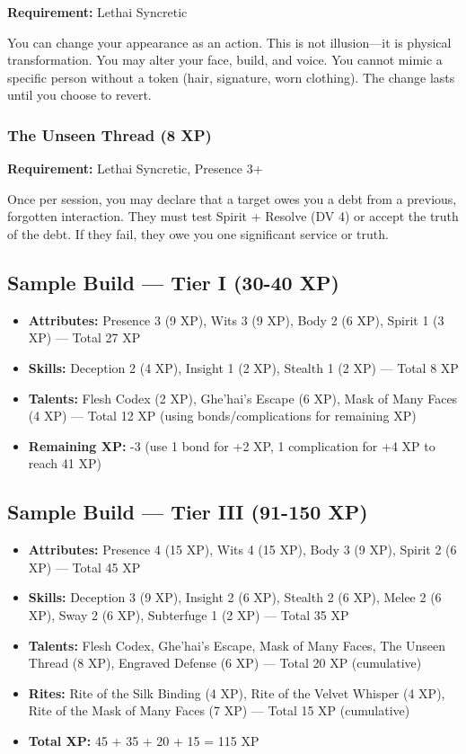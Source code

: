 \textbf{Requirement:} Lethai Syncretic

You can change your appearance as an action. This is not illusion—it is physical transformation. You may alter your face, build, and voice. You cannot mimic a specific person without a token (hair, signature, worn clothing). The change lasts until you choose to revert.

\subsubsection{The Unseen Thread (8 XP)}

\textbf{Requirement:} Lethai Syncretic, Presence 3+

Once per session, you may declare that a target owes you a debt from a previous, forgotten interaction. They must test Spirit + Resolve (DV 4) or accept the truth of the debt. If they fail, they owe you one significant service or truth.

\subsection{Sample Build — Tier I (30-40 XP)}

\begin{itemize}
\item \textbf{Attributes:} Presence 3 (9 XP), Wits 3 (9 XP), Body 2 (6 XP), Spirit 1 (3 XP) — Total 27 XP
\item \textbf{Skills:} Deception 2 (4 XP), Insight 1 (2 XP), Stealth 1 (2 XP) — Total 8 XP
\item \textbf{Talents:} Flesh Codex (2 XP), Ghe'hai's Escape (6 XP), Mask of Many Faces (4 XP) — Total 12 XP (using bonds/complications for remaining XP)
\item \textbf{Remaining XP:} -3 (use 1 bond for +2 XP, 1 complication for +4 XP to reach 41 XP)
\end{itemize}

\subsection{Sample Build — Tier III (91-150 XP)}

\begin{itemize}
\item \textbf{Attributes:} Presence 4 (15 XP), Wits 4 (15 XP), Body 3 (9 XP), Spirit 2 (6 XP) — Total 45 XP
\item \textbf{Skills:} Deception 3 (9 XP), Insight 2 (6 XP), Stealth 2 (6 XP), Melee 2 (6 XP), Sway 2 (6 XP), Subterfuge 1 (2 XP) — Total 35 XP
\item \textbf{Talents:} Flesh Codex, Ghe'hai's Escape, Mask of Many Faces, The Unseen Thread (8 XP), Engraved Defense (6 XP) — Total 20 XP (cumulative)
\item \textbf{Rites:} Rite of the Silk Binding (4 XP), Rite of the Velvet Whisper (4 XP), Rite of the Mask of Many Faces (7 XP) — Total 15 XP (cumulative)
\item \textbf{Total XP:} 45 + 35 + 20 + 15 = 115 XP
\end{itemize}


